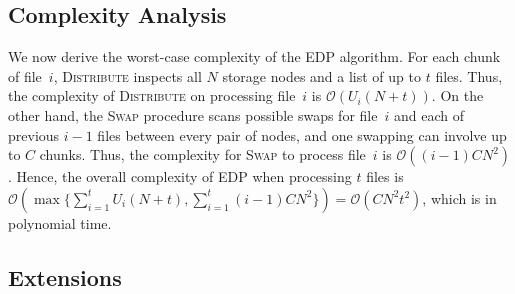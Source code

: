
\subsection{Complexity Analysis}
\label{subsubsec:complexity}

We now derive the worst-case complexity of the EDP algorithm.  For each chunk
of file~$i$, \textsc{Distribute} inspects all $N$ storage nodes and a list of
up to $t$ files.  Thus, the complexity of \textsc{Distribute} on processing 
file~$i$ is $\mathcal{O}(U_i(N+t))$.
On the other hand, the \textsc{Swap} procedure scans possible swaps for 
file~$i$ and each of previous $i-1$ files between every pair of nodes,
and one swapping can involve up to $C$ chunks.  Thus, the complexity for
\textsc{Swap} to process file~$i$ is $\mathcal{O}((i-1)CN^2)$.  Hence, the
overall complexity of EDP when processing $t$ files is 
$\mathcal{O}(\max\{\sum_{i=1}^t U_i(N+t), \sum_{i=1}^t (i-1)CN^2\}) =
\mathcal{O}(CN^2t^2)$, which is in polynomial time. 



\subsection{Extensions}
\label{subsec:cedp}

